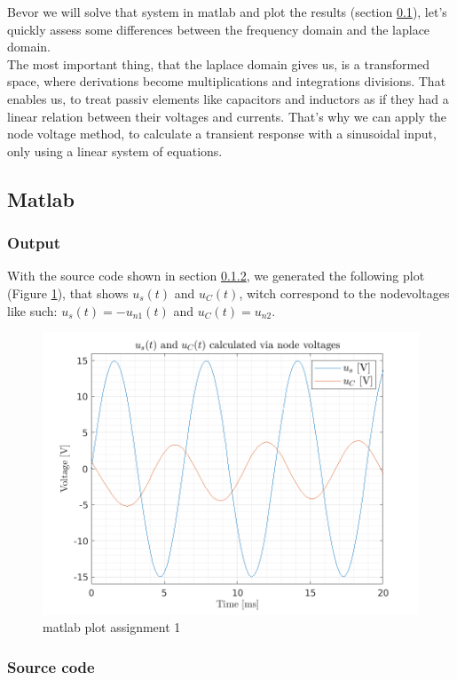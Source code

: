 \documentclass[a4paper]{article}
\begin{document}
Bevor we will solve that system in matlab and plot the results (section \ref{sec:matlab}), 
let's quickly assess some differences between the frequency domain and the laplace domain.
\bigskip
\\The most important thing, that the laplace domain gives us, is a transformed space, where
derivations become multiplications and integrations divisions. That enables us, to treat passiv
elements like capacitors and inductors as if they had a linear relation between their voltages and
currents. That's why we can apply the node voltage method, to calculate a transient response with a 
sinusoidal input, only using a linear system of equations.
\subsection{Matlab} \label{sec:matlab}
\subsubsection{Output}
With the source code shown in section \ref{sec:source}, we generated the following plot (Figure
\ref{fig:matl_ass1}),
that shows $u_{s}(t)$ and $u_{C}(t)$, witch correspond to the nodevoltages like such: $u_{s}(t) = -u_{n1}(t)$
and $u_{C}(t) = u_{n2}$.
\begin{figure}[ht]
  \includegraphics{./Figures/ue8_ass_1_plot.png}
  \caption{matlab plot assignment 1}
  \label{fig:matl_ass1}
\end{figure}

\subsubsection{Source code} \label{sec:source}

\end{document}

